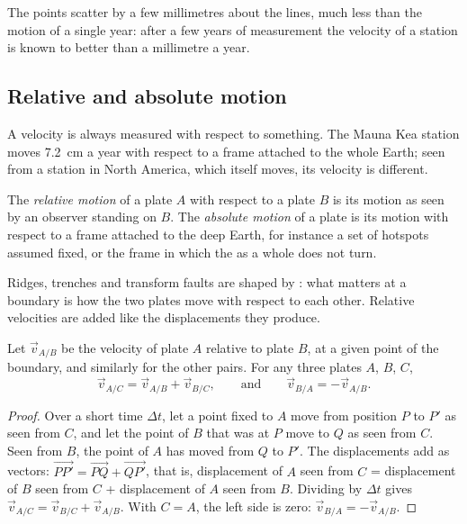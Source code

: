 The points scatter by a few millimetres about the lines, much less than the
motion of a single year: after a few years of measurement the velocity of a
station is known to better than a millimetre a year.

\subsection{Relative and absolute motion}

A velocity is always measured with respect to something. The Mauna Kea
station moves \qty{7.2}{cm} a year with respect to a frame attached to the
whole Earth; seen from a station in North America, which itself moves, its
velocity is different.

\begin{definition}\label{def:g11:plate-motions:relative-motion}
The \emph{relative motion} of a plate $A$ with
respect to a plate $B$ is its motion as seen by an observer standing on $B$.
The \emph{absolute motion} of a plate is its motion
with respect to a frame attached to the deep Earth, for instance a set of
hotspots assumed fixed, or the frame in which the  as a whole does
not turn.
\end{definition}

Ridges, trenches and transform faults are shaped by : what
matters at a boundary is how the two plates move with respect to each other.
Relative velocities are added like the displacements they produce.

\begin{proposition}\label{prop:g11:plate-motions:sum}
Let $\vec v_{A/B}$ be the velocity of plate $A$ relative to plate $B$, at a
given point of the boundary, and similarly for the other pairs. For any three
plates $A$, $B$, $C$,
\[
  \vec v_{A/C} = \vec v_{A/B} + \vec v_{B/C},
  \qquad\text{and}\qquad
  \vec v_{B/A} = -\vec v_{A/B}.
\]
\end{proposition}

\begin{proof}
Over a short time $\Delta t$, let a point fixed to $A$ move from position $P$
to $P'$ as seen from $C$, and let the point of $B$ that was at $P$ move to
$Q$ as seen from $C$. Seen from $B$, the point of $A$ has moved from $Q$ to
$P'$. The displacements add as vectors:
$\overrightarrow{PP'} = \overrightarrow{PQ} + \overrightarrow{QP'}$, that is,
displacement of $A$ seen from $C$ = displacement of $B$ seen from $C$ +
displacement of $A$ seen from $B$. Dividing by $\Delta t$ gives $\vec v_{A/C}
= \vec v_{B/C} + \vec v_{A/B}$. With $C = A$, the left side is zero: $\vec
v_{B/A} = -\vec v_{A/B}$.
\end{proof}

